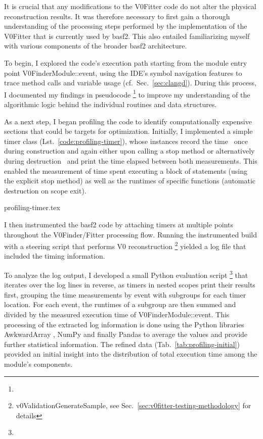 It is crucial that any modifications to the V0Fitter code do not alter the physical reconstruction results.
It was therefore necessary to first gain a thorough understanding of the processing steps performed by the implementation of the V0Fitter that is currently used by basf2.
This also entailed familiarizing myself with various components of the broader basf2 architecture.

To begin, I explored the code's execution path starting from the module entry point V0FinderModule::event, using the IDE's symbol navigation features to trace method calls and variable usage (cf.\ Sec.\ \ref{sec:clangd}).
During this process, I documented my findings in pseudocode%
\footnote{}
to improve my understanding of the algorithmic logic behind the individual routines and data structures.

As a next step, I began profiling the code to identify computationally expensive sections that could be targets for optimization.
Initially, I implemented a simple timer class (Lst.\ \ref{code:profiling-timer}), whose instances record the time \textemdash\ once during construction and again either upon calling a stop method or alternatively during destruction \textemdash\ and print the time elapsed between both measurements.
This enabled the measurement of time spent executing a block of statements (using the explicit stop method) as well as the runtimes of specific functions (automatic destruction on scope exit).

\begin{lstbox}{%
     \label{code:profiling-timer}
  }
  {profiling-timer.tex}
\end{lstbox}

I then instrumented the basf2 code by attaching timers at multiple points throughout the V0Finder/Fitter processing flow.
Running the instrumented build with a steering script that performs V0 reconstruction%
\footnote{v0ValidationGenerateSample, see Sec.\ \ref{sec:v0fitter-testing-methodology} for details} 
yielded a log file that included the timing information.

To analyze the log output, I developed a small Python evaluation script%
\footnote{}
that iterates over the log lines in reverse, as timers in nested scopes print their results first, grouping the time measurements by event with subgroups for each timer location.
For each event, the runtimes of a subgroup are then summed and divided by the measured execution time of V0FinderModule::event.
This processing of the extracted log information is done using the Python libraries AwkwardArray \cite{awkwardarray}, NumPy \cite{numpy} and finally Pandas \cite{pandas} to average the values and provide further statistical information.
The refined data (Tab.\ \ref{tab:profiling-initial}) provided an initial insight into the distribution of total execution time among the module's components.


